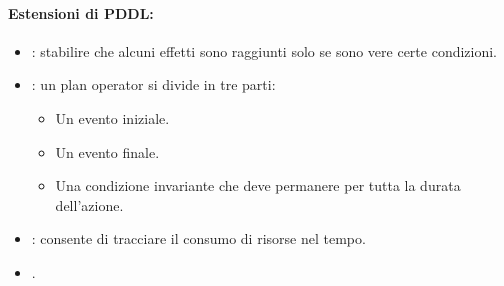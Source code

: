 
\paragraph{Estensioni di PDDL:}

\begin{itemize}
  \item {}: stabilire che alcuni effetti sono raggiunti solo se sono vere certe condizioni. 
  \item {}: un plan operator si divide in tre parti: 
    \begin{itemize}
      \item Un evento iniziale. 
      \item Un evento finale. 
      \item Una condizione invariante che deve permanere per tutta la durata dell'azione. 
    \end{itemize}
  \item {}: consente di tracciare il consumo di risorse nel tempo. 
  \item {}.
\end{itemize}


